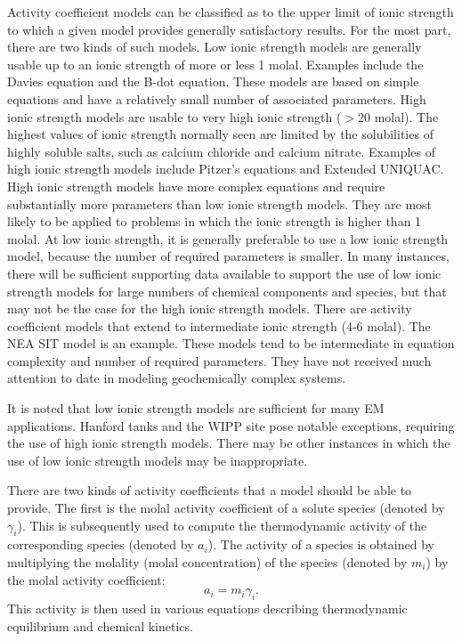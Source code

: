 Activity coefficient models can be classified as to the upper limit of
ionic strength to which a given model provides generally satisfactory
results. For the most part, there are two kinds of such models. Low
ionic strength models are generally usable up to an ionic strength of
more or less 1 molal. Examples include the Davies equation and the
B-dot equation. These models are based on simple equations and have a
relatively small number of associated parameters. High ionic strength
models are usable to very high ionic strength ($>$20 molal).
The highest
values of ionic strength normally seen are limited by the solubilities
of highly soluble salts, such as calcium chloride and calcium nitrate.
Examples of high ionic strength models include Pitzer's equations and
Extended UNIQUAC. High ionic strength models have more complex
equations and require substantially more parameters than low ionic
strength models. They are most likely to be applied to problems in
which the ionic strength is higher than 1 molal. At low ionic
strength, it is generally preferable to use a low ionic strength
model, because the number of required parameters is smaller. In many
instances, there will be sufficient supporting data available to
support the use of low ionic strength models for large numbers of
chemical components and species, but that may not be the case for the
high ionic strength models. There are activity coefficient models that
extend to intermediate ionic strength (4-6 molal). The NEA SIT
model is an example. These models tend to be intermediate in equation
complexity and number of required parameters. They have not received
much attention to date in modeling geochemically complex systems.

It is noted that low ionic strength models are sufficient for many EM
applications. Hanford tanks and the WIPP site pose notable exceptions, requiring the
use of high ionic strength models. There may be other instances in
which the use of low ionic strength models may be inappropriate. 

There are two kinds of activity coefficients that a model should be
able to provide. The first is the molal activity coefficient of a
solute species (denoted by $\gamma _{i}$). This is subsequently used
to compute the thermodynamic activity of the corresponding species
(denoted by $a_{i}$). The activity of a species is obtained by
multiplying the molality (molal concentration) of the species (denoted
by $m_{i}$) by the molal activity coefficient:
%
\begin{equation}
  a_{i} =m_{i} \gamma _{i}.
\end{equation}
%
This activity is then used in various equations describing
thermodynamic equilibrium and chemical kinetics. 

